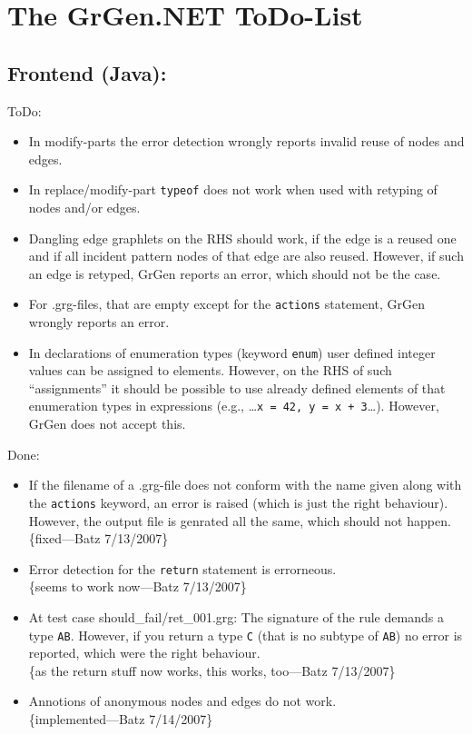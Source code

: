 \documentclass[12pt,a4paper]{article}
\begin{document}
\section*{\LARGE The GrGen.NET ToDo-List}



\subsection*{Frontend (Java):}
ToDo:
\begin{itemize}
	\item In modify-parts the error detection wrongly reports invalid reuse of nodes and edges.
	\item In replace/modify-part {\tt typeof} does not work when used with retyping of nodes and/or edges.
	\item Dangling edge graphlets on the RHS should work, if the edge is a reused one and if all incident pattern nodes of that edge are also reused.
    However, if such an edge is retyped, GrGen reports an error, which should not be the case.
	\item For .grg-files, that are empty except for the {\tt actions} statement, GrGen wrongly reports an error.
	\item In declarations of enumeration types (keyword {\tt enum}) user defined integer values can be assigned to elements.
	  However, on the RHS of such "`assignments"' it should be possible to use already defined elements of that enumeration types in expressions (e.g., \dots{}{\tt{}x = 42, y = x + 3}\dots). However, GrGen does not accept this.
\end{itemize}
Done:
\begin{itemize}
  \item If the filename of a .grg-file does not conform with the name given along with the {\tt actions} keyword, an error is raised (which is just the right behaviour). However, the output file is genrated all the same, which should not happen.\\
    \{fixed---Batz 7/13/2007\}
  \item Error detection for the {\tt return} statement is errorneous.\\
  \{seems to work now---Batz 7/13/2007\}
  \item At test case should\_fail/ret\_001.grg:
  	The signature of the rule demands a type {\tt AB}.
	However, if you return a type {\tt C} (that is no subtype of {\tt AB}) no error is reported, which were the right behaviour.\\
  \{as the return stuff now works, this works, too---Batz 7/13/2007\}
  \item Annotions of anonymous nodes and edges do not work.\\
  \{implemented---Batz 7/14/2007\}
\end{itemize}
\end{document}
